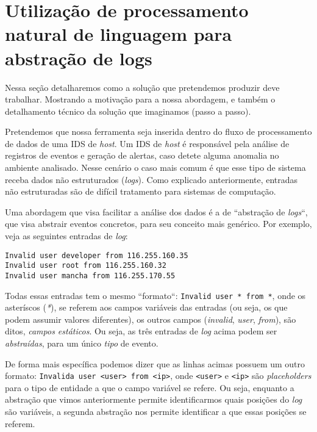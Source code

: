 \documentclass[
	12pt,				%
	openright,			%
	twoside,			%
	a4paper,			%
	english,			%
	spanish,			%
	brazil,				%
	]{abntex2}
\begin{document}

\chapter{Utilização de processamento natural de linguagem para abstração de logs}\label{chap:proposta}

Nessa seção detalharemos como a solução que pretendemos produzir deve trabalhar. Mostrando a motivação para a nossa abordagem, e também o detalhamento técnico da solução que imaginamos (passo a passo).

Pretendemos que nossa ferramenta seja inserida dentro do fluxo de processamento de dados de uma IDS de \emph{host}. Um IDS de \emph{host} é responsável pela análise de registros de eventos e geração de alertas, caso detete alguma anomalia no ambiente analisado. Nesse cenário o caso mais comum é que esse tipo de sistema receba dados não estruturados (\emph{logs}). Como explicado anteriormente, entradas não estruturadas são de difícil tratamento para sistemas de computação.


Uma abordagem que visa facilitar a análise dos dados é a de ``abstração de \emph{logs}``, que visa abstrair eventos concretos, para seu conceito mais genérico. Por exemplo, veja as seguintes entradas de \emph{log}:

\begin{verbatim}
Invalid user developer from 116.255.160.35
Invalid user root from 116.255.160.32
Invalid user mancha from 116.255.170.55
\end{verbatim}
	
Todas essas entradas tem o mesmo ``formato``: \verb|Invalid user * from *|, onde os asteríscos (\emph{*}), se referem aos campos variáveis das entradas (ou seja, os que podem assumir valores diferentes), os outros campos (\emph{invalid}, \emph{user}, \emph{from}), são ditos, \emph{campos estáticos}. Ou seja, as três entradas de \emph{log} acima podem ser \emph{abstraídas}, para um único \emph{tipo} de evento. 

De forma mais específica podemos dizer que as linhas acimas possuem um outro formato: \verb|Invalida user <user> from <ip>|, onde \verb|<user>| e \verb|<ip>| são \emph{placeholders} para o tipo de entidade a que o campo variável se refere. Ou seja, enquanto a abstração que vimos anteriormente permite identificarmos quais posições do \emph{log} são variáveis, a segunda abstração nos permite identificar a que essas posições se referem.
\end{document}
